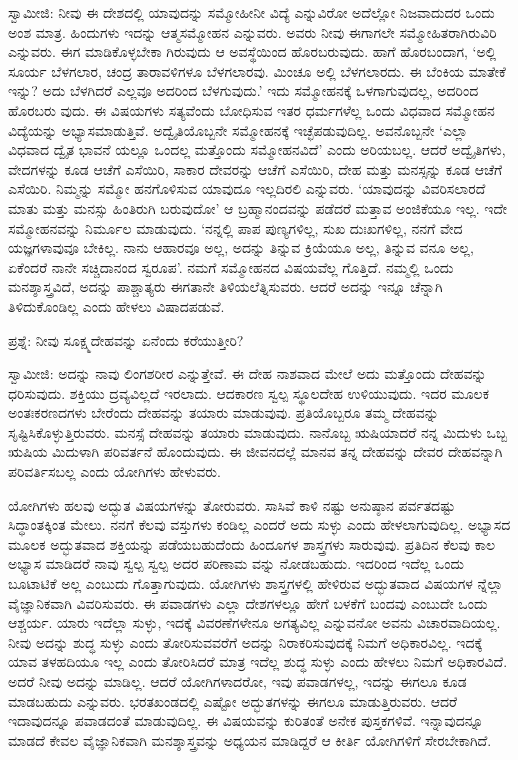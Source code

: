 ಸ್ವಾಮೀಜಿ: ನೀವು ಈ ದೇಶದಲ್ಲಿ ಯಾವುದನ್ನು ಸಮ್ಮೋಹೀನೀ ವಿದ್ಯೆ  ಎನ್ನುವಿರೋ ಅದೆಲ್ಲೋ ನಿಜವಾದುದರ ಒಂದು ಅಂಶ ಮಾತ್ರ. ಹಿಂದುಗಳು ಇದನ್ನು ಆತ್ಮಸಮ್ಮೋಹನ  ಎನ್ನುವರು. ಅವರು ನೀವು ಈಗಾಗಲೇ ಸಮ್ಮೋಹಿತರಾಗಿರುವಿರಿ ಎನ್ನುವರು. ಈಗ ಮಾಡಿಕೊಳ್ಳಬೇಕಾ ಗಿರುವುದು ಆ ಅವಸ್ಥೆಯಿಂದ ಹೊರಬರುವುದು. ಹಾಗೆ ಹೊರಬಂದಾಗ, ‘ಅಲ್ಲಿ ಸೂರ್ಯ ಬೆಳಗಲಾರ, ಚಂದ್ರ ತಾರಾವಳಿಗಳೂ ಬೆಳಗಲಾರವು. ಮಿಂಚೂ ಅಲ್ಲಿ ಬೆಳಗಲಾರದು. ಈ ಬೆಂಕಿಯ ಮಾತೇಕೆ ಇನ್ನು? ಅದು ಬೆಳಗಿದರೆ ಎಲ್ಲವೂ ಅದರಿಂದ ಬೆಳಗುವುದು.’ ಇದು ಸಮ್ಮೋಹನಕ್ಕೆ ಒಳಗಾಗುವುದಲ್ಲ, ಅದರಿಂದ ಹೊರಬರು ವುದು. ಈ ವಿಷಯಗಳು ಸತ್ಯವೆಂದು ಬೋಧಿಸುವ ಇತರ ಧರ್ಮಗಳೆಲ್ಲ ಒಂದು ವಿಧವಾದ ಸಮ್ಮೋಹನ ವಿದ್ಯೆಯನ್ನು ಅಭ್ಯಾಸಮಾಡುತ್ತಿವೆ. ಅದ್ವೈತಿಯೊಬ್ಬನೇ ಸಮ್ಮೋಹನಕ್ಕೆ ಇಚ್ಛೆಪಡುವುದಿಲ್ಲ. ಅವನೊಬ್ಬನೇ ‘ಎಲ್ಲಾ ವಿಧವಾದ ದ್ವೈತ ಭಾವನೆ ಯಲ್ಲೂ ಒಂದಲ್ಲ ಮತ್ತೊಂದು ಸಮ್ಮೋಹನವಿದೆ’ ಎಂದು ಅರಿಯಬಲ್ಲ. ಆದರೆ ಅದ್ವೈತಿಗಳು, ವೇದಗಳನ್ನು ಕೂಡ ಆಚೆಗೆ ಎಸೆಯಿರಿ, ಸಾಕಾರ ದೇವರನ್ನು ಆಚೆಗೆ ಎಸೆಯಿರಿ, ದೇಹ ಮತ್ತು ಮನಸ್ಸನ್ನು ಕೂಡ ಆಚೆಗೆ ಎಸೆಯಿರಿ. ನಿಮ್ಮನ್ನು ಸಮ್ಮೋ ಹನಗೊಳಿಸುವ ಯಾವುದೂ ಇಲ್ಲದಿರಲಿ ಎನ್ನುವರು. ‘ಯಾವುದನ್ನು ವಿವರಿಸಲಾರದೆ ಮಾತು ಮತ್ತು ಮನಸ್ಸು ಹಿಂತಿರುಗಿ ಬರುವುದೋ’ ಆ ಬ್ರಹ್ಮಾನಂದವನ್ನು ಪಡೆದರೆ ಮತ್ತಾವ ಅಂಜಿಕೆಯೂ ಇಲ್ಲ. ಇದೇ ಸಮ್ಮೋಹನವನ್ನು ನಿರ್ಮೂಲ ಮಾಡುವುದು. ‘ನನ್ನಲ್ಲಿ ಪಾಪ ಪುಣ್ಯಗಳಿಲ್ಲ, ಸುಖ ದುಃಖಗಳಿಲ್ಲ, ನನಗೆ ವೇದ ಯಜ್ಞಗಳಾವುವೂ ಬೇಕಿಲ್ಲ. ನಾನು ಆಹಾರವೂ ಅಲ್ಲ, ಅದನ್ನು ತಿನ್ನುವ ಕ್ರಿಯೆಯೂ ಅಲ್ಲ, ತಿನ್ನುವ ವನೂ ಅಲ್ಲ, ಏಕೆಂದರೆ ನಾನೇ ಸಚ್ಚಿದಾನಂದ ಸ್ವರೂಪ’. ನಮಗೆ ಸಮ್ಮೋಹನದ ವಿಷಯವೆಲ್ಲ ಗೊತ್ತಿದೆ. ನಮ್ಮಲ್ಲಿ ಒಂದು ಮನಶ್ಶಾಸ್ತ್ರವಿದೆ, ಅದನ್ನು ಪಾಶ್ಚಾತ್ಯರು ಈಗತಾನೇ ತಿಳಿಯಲೆತ್ನಿಸುವರು. ಆದರೆ ಅದನ್ನು ಇನ್ನೂ ಚೆನ್ನಾಗಿ ತಿಳಿದುಕೊಂಡಿಲ್ಲ ಎಂದು ಹೇಳಲು ವಿಷಾದಪಡುವೆ.

ಪ್ರಶ್ನೆ: ನೀವು ಸೂಕ್ಷ್ಮದೇಹವನ್ನು ಏನೆಂದು ಕರೆಯುತ್ತೀರಿ?

ಸ್ವಾಮೀಜಿ: ಅದನ್ನು ನಾವು ಲಿಂಗಶರೀರ ಎನ್ನುತ್ತೇವೆ. ಈ ದೇಹ ನಾಶವಾದ ಮೇಲೆ ಅದು ಮತ್ತೊಂದು ದೇಹವನ್ನು ಧರಿಸುವುದು. ಶಕ್ತಿಯು ದ್ರವ್ಯವಿಲ್ಲದೆ ಇರಲಾದು. ಆದಕಾರಣ ಸ್ವಲ್ಪ ಸ್ಥೂಲದೇಹ ಉಳಿಯುವುದು. ಇದರ ಮೂಲಕ ಅಂತಃಕರಣದಗಳು ಬೇರೆಂದು ದೇಹವನ್ನು ತಯಾರು ಮಾಡುವುವು. ಪ್ರತಿಯೊಬ್ಬರೂ ತಮ್ಮ ದೇಹವನ್ನು ಸೃಷ್ಟಿಸಿಕೊಳ್ಳುತ್ತಿರುವರು. ಮನಸ್ಸೆ ದೇಹವನ್ನು ತಯಾರು ಮಾಡುವುದು. ನಾನೊಬ್ಬ ಋಷಿಯಾದರೆ ನನ್ನ ಮಿದುಳು ಒಬ್ಬ ಋಷಿಯ ಮಿದುಳಾಗಿ ಪರಿವರ್ತನೆ ಹೊಂದುವುದು. ಈ ಜೀವನದಲ್ಲೆ ಮಾನವ ತನ್ನ ದೇಹವನ್ನು ದೇವರ ದೇಹವನ್ನಾಗಿ ಪರಿವರ್ತಿಸಬಲ್ಲ ಎಂದು ಯೋಗಿಗಳು ಹೇಳುವರು.

ಯೋಗಿಗಳು ಹಲವು ಅದ್ಭುತ ವಿಷಯಗಳನ್ನು ತೋರುವರು. ಸಾಸಿವೆ ಕಾಳಿ ನಷ್ಟು ಅನುಷ್ಠಾನ ಪರ್ವತದಷ್ಟು ಸಿದ್ಧಾಂತಕ್ಕಿಂತ ಮೇಲು. ನನಗೆ ಕೆಲವು ವಸ್ತುಗಳು ಕಂಡಿಲ್ಲ ಎಂದರೆ ಅದು ಸುಳ್ಳು ಎಂದು ಹೇಳಲಾಗುವುದಿಲ್ಲ. ಅಭ್ಯಾಸದ ಮೂಲಕ ಅದ್ಭುತವಾದ ಶಕ್ತಿಯನ್ನು ಪಡೆಯಬಹುದೆಂದು ಹಿಂದೂಗಳ ಶಾಸ್ತ್ರಗಳು ಸಾರುವುವು. ಪ್ರತಿದಿನ ಕೆಲವು ಕಾಲ ಅಭ್ಯಾಸ ಮಾಡಿದರೆ ನಾವು ಸ್ವಲ್ಪ ಸ್ವಲ್ಪ ಅದರ ಪರಿಣಾಮ ವನ್ನು ನೋಡಬಹುದು. ಇದರಿಂದ ಇದೆಲ್ಲ ಒಂದು ಬೂಟಾಟಿಕೆ ಅಲ್ಲ ಎಂಬುದು ಗೊತ್ತಾಗುವುದು. ಯೋಗಿಗಳು ಶಾಸ್ತ್ರಗಳಲ್ಲಿ ಹೇಳಿರುವ ಅದ್ಭುತವಾದ ವಿಷಯಗಳ ನ್ನೆಲ್ಲಾ ವೈಜ್ಞಾನಿಕವಾಗಿ ವಿವರಿಸುವರು. ಈ ಪವಾಡಗಳು ಎಲ್ಲಾ ದೇಶಗಳಲ್ಲೂ ಹೇಗೆ ಬಳಕೆಗೆ ಬಂದವು ಎಂಬುದೇ ಒಂದು ಆಶ್ಚರ್ಯ. ಯಾರು ಇದೆಲ್ಲಾ ಸುಳ್ಳು, ಇದಕ್ಕೆ ವಿವರಣೆಗಳೇನೂ ಅಗತ್ಯವಿಲ್ಲ ಎನ್ನುವನೋ ಅವನು ವಿಚಾರವಾದಿಯಲ್ಲ. ನೀವು ಅದನ್ನು ಶುದ್ಧ ಸುಳ್ಳು ಎಂದು ತೋರಿಸುವವರೆಗೆ ಅದನ್ನು ನಿರಾಕರಿಸುವುದಕ್ಕೆ ನಿಮಗೆ ಅಧಿಕಾರವಿಲ್ಲ. ಇದಕ್ಕೆ ಯಾವ ತಳಹದಿಯೂ ಇಲ್ಲ ಎಂದು ತೋರಿಸಿದರೆ ಮಾತ್ರ ಇದೆಲ್ಲ ಶುದ್ಧ ಸುಳ್ಳು ಎಂದು ಹೇಳಲು ನಿಮಗೆ ಅಧಿಕಾರವಿದೆ. ಅದರೆ ನೀವು ಅದನ್ನು ಮಾಡಿಲ್ಲ. ಆದರೆ ಯೋಗಿಗಳಾದರೋ, ಇವು ಪವಾಡಗಳಲ್ಲ, ಇದನ್ನು ಈಗಲೂ ಕೂಡ ಮಾಡಬಹುದು ಎನ್ನುವರು. ಭರತಖಂಡದಲ್ಲಿ ಎಷ್ಟೋ ಅದ್ಭುತಗಳನ್ನು ಈಗಲೂ ಮಾಡುತ್ತಿರುವರು. ಆದರೆ ಇದಾವುದನ್ನೂ ಪವಾಡದಂತೆ ಮಾಡುವುದಿಲ್ಲ. ಈ ವಿಷಯವನ್ನು ಕುರಿತಂತೆ ಅನೇಕ ಪುಸ್ತಕಗಳಿವೆ. ಇನ್ನಾವುದನ್ನೂ ಮಾಡದೆ ಕೇವಲ ವೈಜ್ಞಾನಿಕವಾಗಿ ಮನಶ್ಶಾಸ್ತ್ರವನ್ನು ಅಧ್ಯಯನ ಮಾಡಿದ್ದರೆ ಆ ಕೀರ್ತಿ ಯೋಗಿಗಳಿಗೆ ಸೇರಬೇಕಾಗಿದೆ.

